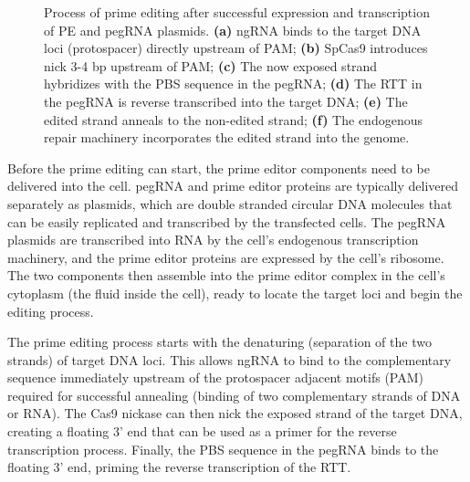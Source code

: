 \begin{figure}[ht]
    \centering
    \caption[Process of prime editing]{Process of prime editing after successful expression and transcription of PE and pegRNA plasmids. \textbf{(a)} ngRNA binds to the target DNA loci (protospacer) directly upstream of PAM; \textbf{(b)} SpCas9 introduces nick 3-4 bp upstream of PAM; \textbf{(c)} The now exposed strand hybridizes with the PBS sequence in the pegRNA; \textbf{(d)} The RTT in the pegRNA is reverse transcribed into the target DNA; \textbf{(e)} The edited strand anneals to the non-edited strand; \textbf{(f)} The endogenous repair machinery incorporates the edited strand into the genome.}
    \label{fig:prime-editing-process}
\end{figure}

Before the prime editing can start, the prime editor components need to be delivered into the cell. pegRNA and prime editor proteins are typically delivered separately as plasmids, which are double stranded circular DNA molecules that can be easily replicated and transcribed by the transfected cells. The pegRNA plasmids are transcribed into RNA by the cell's endogenous transcription machinery, and the prime editor proteins are expressed by the cell's ribosome. The two components then assemble into the prime editor complex in the cell's cytoplasm (the fluid inside the cell), ready to locate the target loci and begin the editing process\cite{liudavidr.SearchandreplaceGenomeEditing2019}. 

The prime editing process starts with the denaturing (separation of the two strands) of target DNA loci. This allows ngRNA to bind to the complementary sequence immediately upstream of the protospacer adjacent motifs (PAM) required for successful annealing (binding of two complementary strands of DNA or RNA). The Cas9 nickase can then nick the exposed strand of the target DNA, creating a floating 3' end that can be used as a primer for the reverse transcription process. Finally, the PBS sequence in the pegRNA binds to the floating 3' end, priming the reverse transcription of the RTT.

